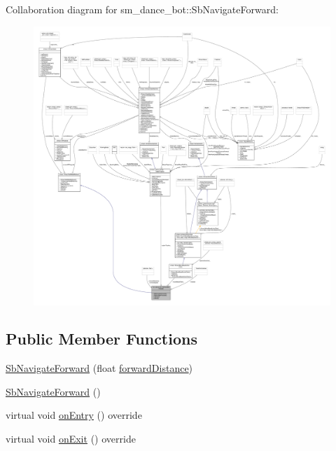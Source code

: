 Collaboration diagram for sm\+\_\+dance\+\_\+bot\+:\+:Sb\+Navigate\+Forward\+:
\nopagebreak
\begin{figure}[H]
\begin{center}
\leavevmode
\includegraphics[width=350pt]{classsm__dance__bot_1_1SbNavigateForward__coll__graph}
\end{center}
\end{figure}
\subsection*{Public Member Functions}
\begin{DoxyCompactItemize}
\item 
\hyperlink{classsm__dance__bot_1_1SbNavigateForward_ad82612da6d53530a94662e9710bfe8f0}{Sb\+Navigate\+Forward} (float \hyperlink{classsm__dance__bot_1_1SbNavigateForward_a2b828c7cd081219448112a2161a62aab}{forward\+Distance})
\item 
\hyperlink{classsm__dance__bot_1_1SbNavigateForward_ad6326b453349f497ce280202d073c840}{Sb\+Navigate\+Forward} ()
\item 
virtual void \hyperlink{classsm__dance__bot_1_1SbNavigateForward_a22ac871fbf5adff4576e46e48211dfb1}{on\+Entry} () override
\item 
virtual void \hyperlink{classsm__dance__bot_1_1SbNavigateForward_a0d61710d752b2e6f07bc2a33a67c19d0}{on\+Exit} () override
\end{DoxyCompactItemize}
